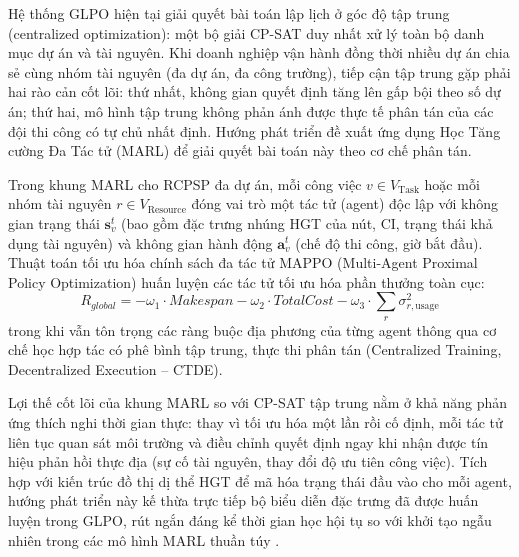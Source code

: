 Hệ thống GLPO hiện tại giải quyết bài toán lập lịch ở góc độ tập trung (centralized optimization): một bộ giải CP-SAT duy nhất xử lý toàn bộ danh mục dự án và tài nguyên. Khi doanh nghiệp vận hành đồng thời nhiều dự án chia sẻ cùng nhóm tài nguyên (đa dự án, đa công trường), tiếp cận tập trung gặp phải hai rào cản cốt lõi: thứ nhất, không gian quyết định tăng lên gấp bội theo số dự án; thứ hai, mô hình tập trung không phản ánh được thực tế phân tán của các đội thi công có tự chủ nhất định. Hướng phát triển đề xuất ứng dụng Học Tăng cường Đa Tác tử (MARL) để giải quyết bài toán này theo cơ chế phân tán.

Trong khung MARL cho RCPSP đa dự án, mỗi công việc $v \in V_{\text{Task}}$ hoặc mỗi nhóm tài nguyên $r \in V_{\text{Resource}}$ đóng vai trò một tác tử (agent) độc lập với không gian trạng thái $\mathbf{s}_v^t$ (bao gồm đặc trưng nhúng HGT của nút, CI, trạng thái khả dụng tài nguyên) và không gian hành động $\mathbf{a}_v^t$ (chế độ thi công, giờ bắt đầu). Thuật toán tối ưu hóa chính sách đa tác tử MAPPO (Multi-Agent Proximal Policy Optimization) \cite{yu2022surprising} huấn luyện các tác tử tối ưu hóa phần thưởng toàn cục:
\begin{equation}
    R_{global} = -\omega_1 \cdot Makespan - \omega_2 \cdot TotalCost - \omega_3 \cdot \sum_{r} \sigma^2_{r,\text{usage}}
\end{equation}
trong khi vẫn tôn trọng các ràng buộc địa phương của từng agent thông qua cơ chế học hợp tác có phê bình tập trung, thực thi phân tán (Centralized Training, Decentralized Execution -- CTDE).

Lợi thế cốt lõi của khung MARL so với CP-SAT tập trung nằm ở khả năng phản ứng thích nghi thời gian thực: thay vì tối ưu hóa một lần rồi cố định, mỗi tác tử liên tục quan sát môi trường và điều chỉnh quyết định ngay khi nhận được tín hiệu phản hồi thực địa (sự cố tài nguyên, thay đổi độ ưu tiên công việc). Tích hợp với kiến trúc đồ thị dị thể HGT để mã hóa trạng thái đầu vào cho mỗi agent, hướng phát triển này kế thừa trực tiếp bộ biểu diễn đặc trưng đã được huấn luyện trong GLPO, rút ngắn đáng kể thời gian học hội tụ so với khởi tạo ngẫu nhiên trong các mô hình MARL thuần túy \cite{lin2024multiagentrl}.

